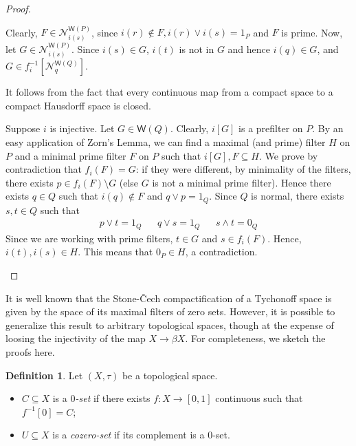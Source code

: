 \documentclass{article}
\newcommand{\opencorn}[2]{\mathcal{N}^{\mathsf{W}(#1)}_{#2}}
\theoremstyle{plain}
\theoremstyle{definition}
\newtheorem{definition}[theorem]{Definition}
\theoremstyle{remark}
\newcommand{\0}{\mathbbm 0}
\newcommand{\1}{\mathbbm 1}
\newcommand{\2}{\mathbbm 2}
\begin{document}
\begin{proof}
\begin{description}[font=\normalfont\itshape]
    Clearly, $F \in \opencorn{P}{i(s)} $, since $i(r) \notin F, i(r) \vee i(s)=1_P$ and $F$ is prime. Now, let $G \in \opencorn{P}{i(s)}$. Since $i(s) \in G$, $i(t)$ is not in $G$ and hence $i(q)\in G$, and $G \in f_i^{-1}[\opencorn{Q}{q}] $.

  \item[$f_i$ is closed.] It follows from the fact that every continuous map from a compact space to a compact Hausdorff space is closed.
    
\item[If $i$ is injective, then $ f_i$ is surjective.] Suppose $i$ is injective. Let $G \in \mathsf{W}(Q)$. Clearly, $i[G]$ is a prefilter on $P$. By an easy application of Zorn's Lemma, we can find a maximal  (and prime) filter $H$ on $P$ and a minimal prime filter $F$ on $P$ such that $i[G], F \subseteq H$. 
We prove by contradiction that $f_i(F)=G$: if they were different, by minimality of the filters, there exists $p \in f_i(F) \setminus G$ (else $G$ is not a minimal prime filter). Hence there exists $q \in Q$ such that $i(q) \notin F$ and $q \vee p=1_Q$. Since $Q$ is normal, there exists $s,t \in Q$ such that \begin{align*}
        p \vee t = 1_Q && q \vee  s = 1_Q && s \wedge t =0_Q
    \end{align*}
Since we are working with prime filters, $t \in G$ and $s \in f_i(F)$. Hence, $i(t), i(s) \in H$. This means that $0_P \in H$, a contradiction. 
\end{description}

\end{proof}

It is well known that the Stone-\v{C}ech compactification of a Tychonoff space is given by the space of its maximal filters of zero sets. However, it is possible to generalize this result to  arbitrary topological
  spaces, though at the expense of loosing the injectivity of the map $X \to \beta X$. For completeness, we sketch the proofs here.

\begin{definition}
\label{def:(co)zero-set}
    Let $(X, \tau)$ be a topological space. \begin{itemize}
        \item $C \subseteq X$ is a \emph{$0$-set} if there exists $f : X \to [0,1]$ continuous such that $f^{-1}[0] = C$; 
        \item $U \subseteq X$ is a \emph{cozero-set} if its complement is a $0$-set. 
    \end{itemize}
\end{definition}
\end{document}
